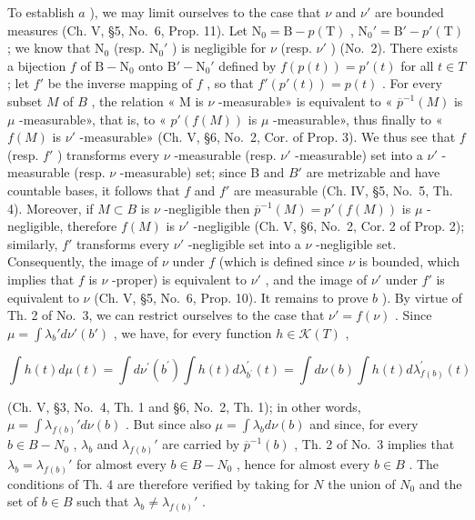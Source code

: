 To establish \(a\) ), we may limit ourselves to the case that \(\nu\) and \(\nu'\) are bounded measures (Ch. V, §5, No.~6, Prop. 11). Let \(\mathrm{N}_0 = \mathrm{B} - p(\mathrm{T})\) , \(\mathrm{N}_0' = \mathrm{B}' - p'(\mathrm{T})\) ; we know that \(\mathrm{N}_0\) (resp. \(\mathrm{N}_0'\) ) is negligible for \(\nu\) (resp. \(\nu'\) ) (No.~2). There exists a bijection \(f\) of \(\mathrm{B} - \mathrm{N}_0\) onto \(\mathrm{B}' - \mathrm{N}_0'\) defined by \(f(p(t)) = p'(t)\) for all \(t \in T\) ; let \(f'\) be the inverse mapping of \(f\) , so that \(f'(p'(t)) = p(t)\) . For every subset \(M\) of \(B\) , the relation « M is \(\nu\) -measurable» is equivalent to « \(\overline{p}^{-1}(M)\) is \(\mu\) -measurable», that is, to « \(p'(f(M))\) is \(\mu\) -measurable», thus finally to « \(f(M)\) is \(\nu'\) -measurable» (Ch. V, §6, No.~2, Cor. of Prop. 3). We thus see that \(f\) (resp. \(f'\) ) transforms every \(\nu\) -measurable (resp. \(\nu'\) -measurable) set into a \(\nu'\) -measurable (resp. \(\nu\) -measurable) set; since B and \(B'\) are metrizable and have countable bases, it follows that \(f\) and \(f'\) are measurable (Ch. IV, §5, No.~5, Th. 4). Moreover, if \(M \subset B\) is \(\nu\) -negligible then \(\overline{p}^{-1}(M) = p'(f(M))\) is \(\mu\) -negligible, therefore \(f(M)\) is \(\nu'\) -negligible (Ch. V, §6, No.~2, Cor. 2 of Prop. 2); similarly, \(f'\) transforms every \(\nu'\) -negligible set into a \(\nu\) -negligible set. Consequently, the image of \(\nu\) under \(f\) (which is defined since \(\nu\) is bounded, which implies that \(f\) is \(\nu\) -proper) is equivalent to \(\nu'\) , and the image of \(\nu'\) under \(f'\) is equivalent to \(\nu\) (Ch. V, §5, No.~6, Prop. 10). It remains to prove \(b\) ). By virtue of Th. 2 of No.~3, we can restrict ourselves to the case that \(\nu' = f(\nu)\) . Since \(\mu = \int \lambda_b' d\nu'(b')\) , we have, for every function \(h \in \mathcal{K}(T)\) ,

\[
\int h (t) d \mu (t) = \int d \nu^ {\prime} (b ^ {\prime}) \int h (t) d \lambda_ {b ^ {\prime}} ^ {\prime} (t) = \int d \nu (b) \int h (t) d \lambda_ {f (b)} ^ {\prime} (t)
\]

(Ch. V, §3, No.~4, Th. 1 and §6, No.~2, Th. 1); in other words, \(\mu = \int \lambda_{f(b)}' d\nu(b)\) . But since also \(\mu = \int \lambda_b d\nu(b)\) and since, for every \(b \in B - N_0\) , \(\lambda_b\) and \(\lambda_{f(b)}'\) are carried by \(\overline{p}^{-1}(b)\) , Th. 2 of No.~3 implies that \(\lambda_b = \lambda_{f(b)}'\) for almost every \(b \in B - N_0\) , hence for almost every \(b \in B\) . The conditions of Th. 4 are therefore verified by taking for \(N\) the union of \(N_0\) and the set of \(b \in B\) such that \(\lambda_b \neq \lambda_{f(b)}'\) .

